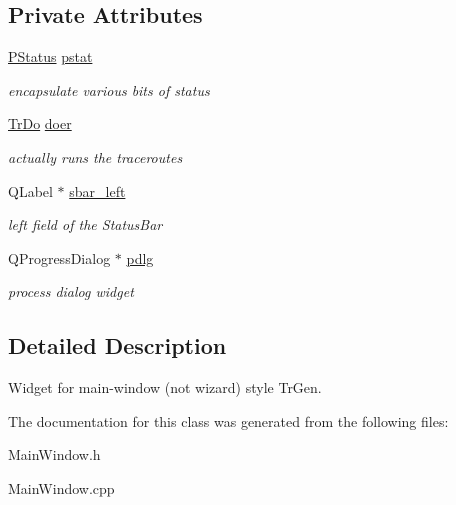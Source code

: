 \subsection*{Private Attributes}
\begin{CompactItemize}
\item 
\hypertarget{classMainWindow_617d869eea9fc6bcd9e6802319f7b773}{
\hyperlink{classPStatus}{PStatus} \hyperlink{classMainWindow_617d869eea9fc6bcd9e6802319f7b773}{pstat}}
\label{classMainWindow_617d869eea9fc6bcd9e6802319f7b773}

\begin{CompactList}\small\item\em encapsulate various bits of status \item\end{CompactList}\item 
\hypertarget{classMainWindow_08d29ad1b52f7d36b85bcb11c1f5b5cd}{
\hyperlink{classTrDo}{TrDo} \hyperlink{classMainWindow_08d29ad1b52f7d36b85bcb11c1f5b5cd}{doer}}
\label{classMainWindow_08d29ad1b52f7d36b85bcb11c1f5b5cd}

\begin{CompactList}\small\item\em actually runs the traceroutes \item\end{CompactList}\item 
\hypertarget{classMainWindow_0992eb7fffdfd24227fac1678b56fe4d}{
QLabel $\ast$ \hyperlink{classMainWindow_0992eb7fffdfd24227fac1678b56fe4d}{sbar\_\-left}}
\label{classMainWindow_0992eb7fffdfd24227fac1678b56fe4d}

\begin{CompactList}\small\item\em left field of the StatusBar \item\end{CompactList}\item 
\hypertarget{classMainWindow_fb0f9e4af85f4b11db2e51b808823fbc}{
QProgressDialog $\ast$ \hyperlink{classMainWindow_fb0f9e4af85f4b11db2e51b808823fbc}{pdlg}}
\label{classMainWindow_fb0f9e4af85f4b11db2e51b808823fbc}

\begin{CompactList}\small\item\em process dialog widget \item\end{CompactList}\end{CompactItemize}


\subsection{Detailed Description}
Widget for main-window (not wizard) style TrGen. 

The documentation for this class was generated from the following files:\begin{CompactItemize}
\item 
MainWindow.h\item 
MainWindow.cpp\end{CompactItemize}
